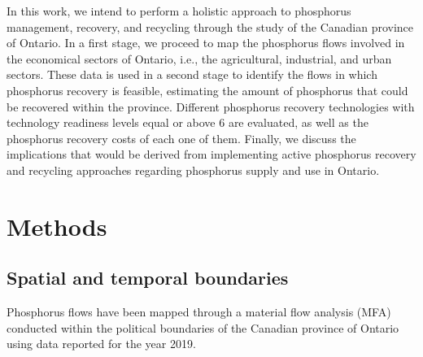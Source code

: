 \documentclass[authoryear]{elsarticle}
\begin{document}
In this work, we intend to perform a holistic approach to phosphorus management,
recovery, and recycling through the study of the Canadian province of Ontario. In a first stage, we proceed to map the phosphorus flows involved in the economical sectors of Ontario, i.e., the agricultural, industrial, and urban sectors. These data is used in a second stage to identify the flows in which phosphorus recovery is feasible, estimating the amount of phosphorus that could be recovered within the province.
Different phosphorus recovery technologies with technology readiness levels equal or above 6 are evaluated, as well as the phosphorus recovery costs of each one of them. Finally, we discuss the implications that would be derived from implementing active phosphorus recovery and recycling approaches regarding phosphorus supply and use in Ontario.

\section{Methods}

%

\subsection{Spatial  and temporal boundaries}
Phosphorus flows have been mapped through a material flow analysis (MFA) \citep{brunner2016handbook} conducted within the political boundaries of the Canadian province of Ontario using data reported for the year 2019. 
%
%
\end{document}
